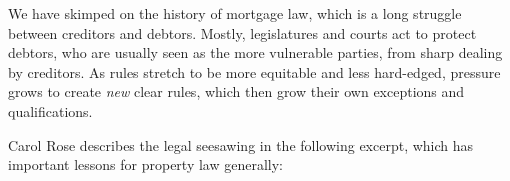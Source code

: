 We have skimped on the history of mortgage law, which is a long struggle between
creditors and debtors.  Mostly, legislatures and courts act to protect debtors,
who are usually seen as the more vulnerable parties, from sharp dealing by
creditors.  As rules stretch to be more equitable and less hard-edged, pressure
grows to create \textit{new} clear rules, which then grow their own exceptions
and qualifications.

Carol Rose describes the legal seesawing in the following excerpt, which has
important lessons for property law generally:

